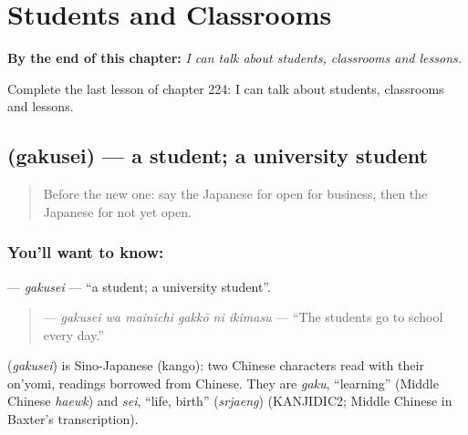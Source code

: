 
\chapter{Students and Classrooms}
\label{ch:ja-students-and-classrooms}

\begin{chapteropening}
\textbf{By the end of this chapter:} \emph{I can talk about students, classrooms and lessons.}

Complete the last lesson of chapter 224: I can talk about students, classrooms and lessons.
\end{chapteropening}

\section[\texorpdfstring{\ja{がくせい} (gakusei)}{がくせい (gakusei)}]{ (gakusei) — a student; a university student}

\label{lesson:JA-C224-gakusei}



\begin{quote}
Before the new one: say the Japanese for open for business, then the Japanese for not yet open.
\end{quote}

\subsection*{You'll want to know: }
\textbf{} — \emph{gakusei} — \textquotedblleft{}a student; a university student\textquotedblright{}.

\begin{quote}
\textbf{   } — \emph{gakusei wa mainichi gakkō ni ikimasu} — \textquotedblleft{}The students go to school every day.\textquotedblright{}
\end{quote}

\begin{cousinweb}
\textbf{} (\emph{gakusei}) is Sino-Japanese (kango): two Chinese characters read with their on'yomi, readings borrowed from Chinese. They are \emph{gaku}, \textquotedblleft{}learning\textquotedblright{} (Middle Chinese \emph{haewk}) and \emph{sei}, \textquotedblleft{}life, birth\textquotedblright{} (\emph{srjaeng}) (KANJIDIC2; Middle Chinese in Baxter's transcription).
\end{cousinweb}

